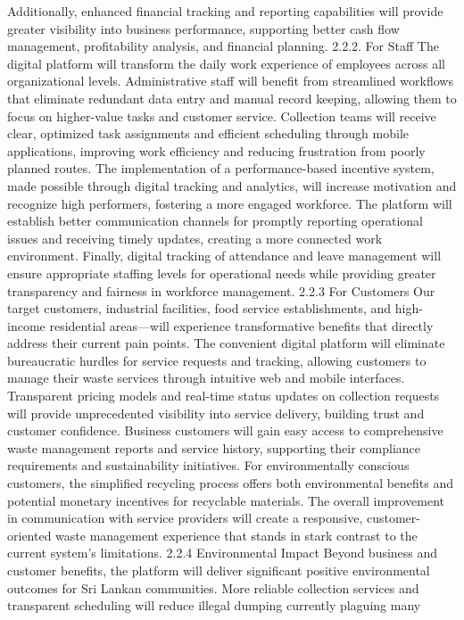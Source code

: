 \documentclass{article}
\begin{document}
Additionally, enhanced financial tracking and reporting capabilities will provide greater 
visibility into business performance, supporting better cash flow management, 
profitability analysis, and financial planning. 
    2.2.2. For Staff 
The digital platform will transform the daily work experience of employees across all 
organizational levels. Administrative staff will benefit from streamlined workflows that 
eliminate redundant data entry and manual record keeping, allowing them to focus on 
higher-value tasks and customer service. Collection teams will receive clear, optimized 
task assignments and efficient scheduling through mobile applications, improving work 
efficiency and reducing frustration from poorly planned routes. The implementation of a 
performance-based incentive system, made possible through digital tracking and 
analytics, will increase motivation and recognize high performers, fostering a more 
engaged workforce. The platform will establish better communication channels for 
promptly reporting operational issues and receiving timely updates, creating a more 
connected work environment. Finally, digital tracking of attendance and leave 
management will ensure appropriate staffing levels for operational needs while 
providing greater transparency and fairness in workforce management. 
    2.2.3 For Customers 
Our target customers, industrial facilities, food service establishments, and high-income 
residential areas—will experience transformative benefits that directly address their 
current pain points. The convenient digital platform will eliminate bureaucratic hurdles 
for service requests and tracking, allowing customers to manage their waste services 
through intuitive web and mobile interfaces. Transparent pricing models and real-time 
status updates on collection requests will provide unprecedented visibility into service 
delivery, building trust and customer confidence. Business customers will gain easy 
access to comprehensive waste management reports and service history, supporting 
their compliance requirements and sustainability initiatives. For environmentally 
conscious customers, the simplified recycling process offers both environmental 
benefits and potential monetary incentives for recyclable materials. The overall 
improvement in communication with service providers will create a responsive, 
customer-oriented waste management experience that stands in stark contrast to the 
current system's limitations. 
    2.2.4 Environmental Impact 
Beyond business and customer benefits, the platform will deliver significant positive 
environmental outcomes for Sri Lankan communities. More reliable collection services 
and transparent scheduling will reduce illegal dumping currently plaguing many 
\end{document}

